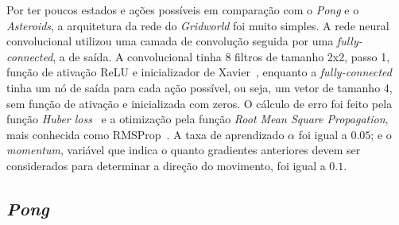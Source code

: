 Por ter poucos estados e ações possíveis em comparação com o \textit{Pong} e o \textit{Asteroids}, a arquitetura da rede do \textit{Gridworld} foi muito simples.
A rede neural convolucional utilizou uma camada de convolução seguida por uma \textit{fully-connected}, a de saída.
A convolucional tinha 8 filtros de tamanho 2x2, passo 1, função de ativação ReLU e inicializador de Xavier~\cite{pmlr-v9-glorot10a}, enquanto a \textit{fully-connected} tinha um nó de saída para cada ação possível, ou seja, um vetor de tamanho 4, sem função de ativação e inicializada com zeros.
O cálculo de erro foi feito pela função \textit{Huber loss}~\cite{huber_loss} e a otimização pela função \textit{Root Mean Square Propagation}, mais conhecida como RMSProp~\cite{rmsprop}.
A taxa de aprendizado $\alpha$ foi igual a $0.05$;
e o \textit{momentum}, variável que indica o quanto gradientes anteriores devem ser considerados para determinar a direção do movimento, foi igual a $0.1$.

\subsection{\textit{Pong}}
\label{sec:arq_pong}

